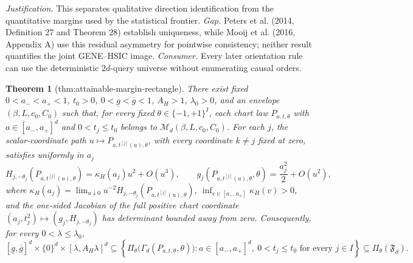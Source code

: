 \documentclass{article}
\newtheorem{theorem}{Theorem}
\begin{document}
\par\smallskip\noindent \textit{Justification.} This separates qualitative direction identification from the quantitative margins used by the statistical frontier. \textit{Gap.} Peters et al. (2014, Definition 27 and Theorem 28) establish uniqueness, while Mooij et al. (2016, Appendix A) use this residual asymmetry for pointwise consistency; neither result quantifies the joint GENE--HSIC image. \textit{Consumer.} Every later orientation rule can use the deterministic \(2d\)-query universe without enumerating causal orders.

\begin{theorem}[thm:attainable-margin-rectangle]\label{thm:attainable-margin-rectangle}
There exist fixed \(0<a_-<a_+<1\), \(t_0>0\), \(0<\underline g<\overline g<1\), \(A_H>1\), \(\lambda_0>0\), and an envelope \((\beta,L,c_0,C_0)\) such that, for every fixed \(\theta\in\{-1,+1\}^I\), each chart law \(P_{a,t,\theta}\) with \(a\in[a_-,a_+]^d\) and \(0<t_j\le t_0\) belongs to \(\mathcal M_d(\beta,L,c_0,C_0)\). For each \(j\), the scalar-coordinate path \(u\mapsto P_{a,t^{[j]}(u),\theta}\), with every coordinate \(k\ne j\) fixed at zero, satisfies uniformly in \(a_j\) \[H_{j,-\theta_j}(P_{a,t^{[j]}(u),\theta})=\kappa_H(a_j)u^2+O(u^3),\qquad g_j(P_{a,t^{[j]}(u),\theta},\theta)=\frac{a_j^2}{2}+O(u^2),\] where \(\kappa_H(a_j)=\lim_{u\downarrow0}u^{-2}H_{j,-\theta_j}(P_{a,t^{[j]}(u),\theta})\), \(\inf_{v\in[a_-,a_+]}\kappa_H(v)>0\), and the one-sided Jacobian of the full positive chart coordinate \((a_j,t_j^2)\mapsto(g_j,H_{j,-\theta_j})\) has determinant bounded away from zero. Consequently, for every \(0<\lambda\le\lambda_0\), \[[\underline g,\overline g]^d\times\{0\}^d\times[\lambda,A_H\lambda]^d\subseteq\left\{\Pi_\theta\bigl(\Gamma_d(P_{a,t,\theta},\theta)\bigr):a\in[a_-,a_+]^d,\ 0<t_j\le t_0\text{ for every }j\in I\right\}\subseteq\Pi_\theta(\mathfrak F_d).\]
\end{theorem}
\end{document}

